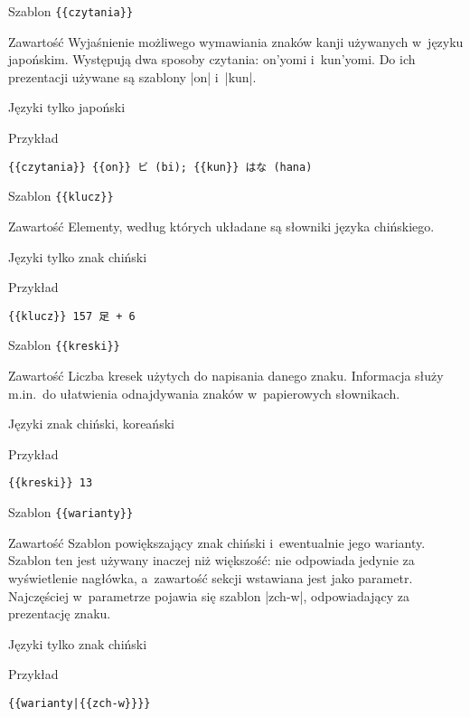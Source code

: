 \spacer %
\begin{opis}
	\item[Szablon] \verb|{{czytania}}|
	\item[Zawartość] Wyjaśnienie możliwego wymawiania znaków kanji używanych w~języku japońskim. Występują dwa sposoby czytania: on'yomi i~kun'yomi. Do ich prezentacji używane są szablony \kod|{{on}}| i~\kod|{{kun}}|.
	\item[Języki] tylko japoński
	\item[Przykład]
\begin{lstlisting}
{{czytania}} {{on}} ビ (bi); {{kun}} はな (hana)
\end{lstlisting}
\end{opis}
\spacer
\begin{opis}
	\item[Szablon] \verb|{{klucz}}|
	\item[Zawartość] Elementy, według których układane są słowniki języka chińskiego.
	\item[Języki] tylko znak chiński
	\item[Przykład]
\begin{lstlisting}
{{klucz}} 157 足 + 6
\end{lstlisting}
\end{opis}
\spacer
\begin{opis}
	\item[Szablon] \verb|{{kreski}}|
	\item[Zawartość] Liczba kresek użytych do napisania danego znaku. Informacja służy m.in.\ do ułatwienia odnajdywania znaków w~papierowych słownikach.
	\item[Języki] znak chiński, koreański
	\item[Przykład]
\begin{lstlisting}
{{kreski}} 13
\end{lstlisting}
\end{opis}
\spacer
\begin{opis}
	\item[Szablon] \verb|{{warianty}}|
	\item[Zawartość] Szablon powiększający znak chiński i~ewentualnie jego warianty. Szablon ten jest używany inaczej niż większość: nie odpowiada jedynie za wyświetlenie nagłówka, a~zawartość sekcji wstawiana jest jako parametr. Najczęściej w~parametrze pojawia się szablon \kod|{{zch-w}}|, odpowiadający za prezentację znaku.
	\item[Języki] tylko znak chiński
	\item[Przykład]
\begin{lstlisting}
{{warianty|{{zch-w}}}}
\end{lstlisting}
\end{opis}
